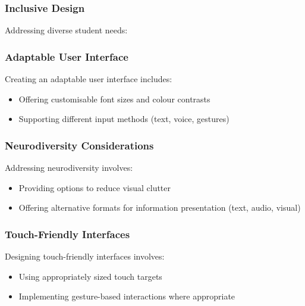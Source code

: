 \documentclass[14pt,a4paper]{article}
\begin{document}
\begin{multicols}{2}
\subsubsection*{Inclusive Design}
Addressing diverse student needs:



\subsubsection*{Adaptable User Interface}
Creating an adaptable user interface \textit{\parencite[pp. 20-50]{HarperYesilada2024}} includes:
\begin{itemize}
    \item Offering customisable font sizes and colour contrasts
    \item Supporting different input methods (text, voice, gestures)
\end{itemize}

\subsubsection*{Neurodiversity Considerations}
Addressing neurodiversity \textit{\parencite[pp. 30-60]{Armstrong2023}} involves:
\begin{itemize}
    \item Providing options to reduce visual clutter
    \item Offering alternative formats for information presentation (text, audio, visual)
\end{itemize}

\subsubsection*{Touch-Friendly Interfaces}
Designing touch-friendly interfaces \textit{\parencite[pp. 80-120]{HooberBerkman2023}} involves:
\begin{itemize}
    \item Using appropriately sized touch targets
    \item Implementing gesture-based interactions where appropriate
\end{itemize}


\end{multicols}
\end{document}
